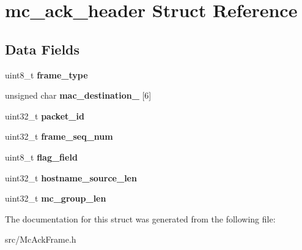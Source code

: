 \hypertarget{structmc__ack__header}{\section{mc\-\_\-ack\-\_\-header Struct Reference}
\label{structmc__ack__header}
}
\subsection*{Data Fields}
\begin{DoxyCompactItemize}
\item 
\hypertarget{structmc__ack__header_ac9cb4165753b5440b1712f9282edee25}{uint8\-\_\-t {\bfseries frame\-\_\-type}}\label{structmc__ack__header_ac9cb4165753b5440b1712f9282edee25}

\item 
\hypertarget{structmc__ack__header_a602240a3c7ddbf7d5d9e8b149f5cdd94}{unsigned char {\bfseries mac\-\_\-destination\-\_\-} \mbox{[}6\mbox{]}}\label{structmc__ack__header_a602240a3c7ddbf7d5d9e8b149f5cdd94}

\item 
\hypertarget{structmc__ack__header_a50cdece6a4a8af7874d80c05ac900fbf}{uint32\-\_\-t {\bfseries packet\-\_\-id}}\label{structmc__ack__header_a50cdece6a4a8af7874d80c05ac900fbf}

\item 
\hypertarget{structmc__ack__header_a2770f6a06ebd8a1e0857253d8ceac1a0}{uint32\-\_\-t {\bfseries frame\-\_\-seq\-\_\-num}}\label{structmc__ack__header_a2770f6a06ebd8a1e0857253d8ceac1a0}

\item 
\hypertarget{structmc__ack__header_abb39fe93c37d60de2adbae586ab9a3b0}{uint8\-\_\-t {\bfseries flag\-\_\-field}}\label{structmc__ack__header_abb39fe93c37d60de2adbae586ab9a3b0}

\item 
\hypertarget{structmc__ack__header_a56a55f895a24fe8c4f1d95782fc9cf47}{uint32\-\_\-t {\bfseries hostname\-\_\-source\-\_\-len}}\label{structmc__ack__header_a56a55f895a24fe8c4f1d95782fc9cf47}

\item 
\hypertarget{structmc__ack__header_aa4e25c215cbc5411df2958926d4086a7}{uint32\-\_\-t {\bfseries mc\-\_\-group\-\_\-len}}\label{structmc__ack__header_aa4e25c215cbc5411df2958926d4086a7}

\end{DoxyCompactItemize}


The documentation for this struct was generated from the following file\-:\begin{DoxyCompactItemize}
\item 
src/Mc\-Ack\-Frame.\-h\end{DoxyCompactItemize}
